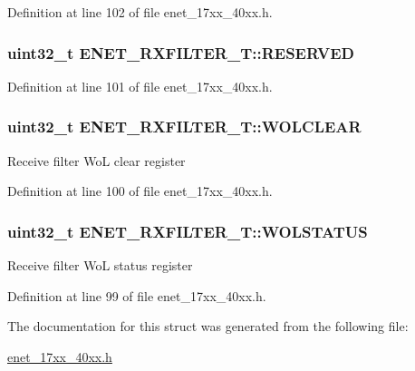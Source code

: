 Definition at line 102 of file enet\+\_\+17xx\+\_\+40xx.\+h.

\subsubsection[{\texorpdfstring{R\+E\+S\+E\+R\+V\+ED}{RESERVED}}]{\setlength{\rightskip}{0pt plus 5cm}uint32\+\_\+t E\+N\+E\+T\+\_\+\+R\+X\+F\+I\+L\+T\+E\+R\+\_\+\+T\+::\+R\+E\+S\+E\+R\+V\+ED}\hypertarget{structENET__RXFILTER__T_a519bb4adc188b23217e7c6e41e2e0ea8}{}\label{structENET__RXFILTER__T_a519bb4adc188b23217e7c6e41e2e0ea8}


Definition at line 101 of file enet\+\_\+17xx\+\_\+40xx.\+h.

\subsubsection[{\texorpdfstring{W\+O\+L\+C\+L\+E\+AR}{WOLCLEAR}}]{ uint32\+\_\+t E\+N\+E\+T\+\_\+\+R\+X\+F\+I\+L\+T\+E\+R\+\_\+\+T\+::\+W\+O\+L\+C\+L\+E\+AR}\hypertarget{structENET__RXFILTER__T_acc4b5d489de8f522d567436de4b10d91}{}\label{structENET__RXFILTER__T_acc4b5d489de8f522d567436de4b10d91}
Receive filter WoL clear register 

Definition at line 100 of file enet\+\_\+17xx\+\_\+40xx.\+h.

\subsubsection[{\texorpdfstring{W\+O\+L\+S\+T\+A\+T\+US}{WOLSTATUS}}]{ uint32\+\_\+t E\+N\+E\+T\+\_\+\+R\+X\+F\+I\+L\+T\+E\+R\+\_\+\+T\+::\+W\+O\+L\+S\+T\+A\+T\+US}\hypertarget{structENET__RXFILTER__T_a40eedf8542d1e384d39cc5fca3fffffb}{}\label{structENET__RXFILTER__T_a40eedf8542d1e384d39cc5fca3fffffb}
Receive filter WoL status register 

Definition at line 99 of file enet\+\_\+17xx\+\_\+40xx.\+h.



The documentation for this struct was generated from the following file\+:\begin{DoxyCompactItemize}
\item 
\hyperlink{enet__17xx__40xx_8h}{enet\+\_\+17xx\+\_\+40xx.\+h}\end{DoxyCompactItemize}
